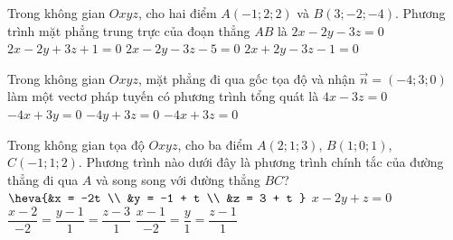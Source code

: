 \begin{ex}%
	Trong không gian $Oxyz$, cho hai điểm $A(-1;2;2)$ và $B(3;-2;-4)$. Phương trình mặt phẳng trung trực của đoạn thẳng $AB$ là
	\choice
	{$2x-2y-3z=0$}
	{$2x-2y+3z+1=0$}
	{\True $2x-2y-3z-5=0$}
	{$2x+2y-3z-1=0$}
\end{ex}

\begin{ex}%
	Trong không gian $Oxyz$, mặt phẳng đi qua gốc tọa độ và nhận $\overrightarrow{n}=(-4;3;0)$ làm một vectơ pháp tuyến có phương trình tổng quát là
	\choice
	{$4x-3z=0$}
	{\True $-4x+3y=0$}
	{$-4y+3z=0$}
	{$-4x+3z=0$}
\end{ex}

\begin{ex}%
Trong không gian tọa độ $Oxyz$, cho ba điểm $A(2;1;3)$, $B(1;0;1)$, $C(-1;1;2)$. Phương trình nào dưới đây là phương trình chính tắc của đường thẳng đi qua $A$ và song song với đường thẳng $BC$?
\choice
{$\heva{&x = -2t \\ &y = -1 + t \\ &z = 3 + t }$}
{$x - 2y + z = 0$}
{\True $\dfrac{x-2}{-2} = \dfrac{y-1}{1} = \dfrac{z-3}{1}$}
{$\dfrac{x-1}{-2} = \dfrac{y}{1} = \dfrac{z-1}{1}$}
\end{ex}

